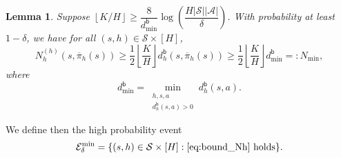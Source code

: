 \documentclass[twoside]{article}
\newtheorem{lemma}{Lemma}
\begin{document}
\begin{lemma}
  \label{lem:high_prob_Nmin}
  Suppose $\left\lfloor K/H\right\rfloor \ge \dfrac{8}{d^{\mathsf b}_{\min}}\log\left(\dfrac{H|\mathcal{S}||\mathcal{A}|}{\delta}\right)$. With probability at least $1-\delta$, we have for all $(s,h) \in \mathcal{S} \times [H]$,
\begin{equation}\label{eq:bound_Nh}
N_h^{(h)}(s, \overline{\pi}_h(s)) \ge \frac{1}{2} \left \lfloor \frac{K}{H} \right \rfloor d^{\mathsf{b}}_h(s,\overline{\pi}_h(s))\ge \frac{1}{2} \left \lfloor \frac{K}{H} \right \rfloor d^{\mathsf{b}}_{\min} =: N_{\min},
\end{equation}
where
 \[d^{\mathsf{b}}_{\min} = \min_{\substack{h,s,a \\ d^{\mathsf{b}}_h(s,a) > 0}} d^{\mathsf{b}}_h(s,a).\]
\end{lemma}
%
We define then the high probability event 
%
\begin{equation}\label{eq:def_Emin}
\mathcal{E}^{\mathrm{min}}_\delta=\{(s,h) \in \mathcal{S} \times [H]:\eqref{eq:bound_Nh} \text{ holds}\}.
\end{equation}
\end{document}
